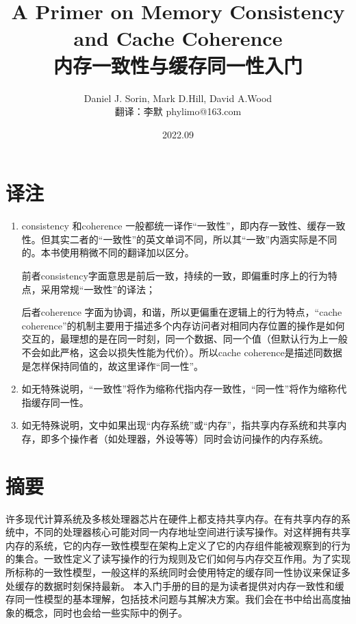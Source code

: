 \documentclass[UTF-8]{ctexrep}
\begin{document}
\title{\textbf{A Primer on Memory Consistency and Cache Coherence}\\内存一致性与缓存同一性入门}
\author{Daniel J. Sorin, Mark D.Hill, David A.Wood \\翻译：李默 phylimo@163.com}
\date{2022.09}
\maketitle
{}
\chapter*{\textbf{译注}}

\begin{enumerate}
\item consistency 和coherence 一般都统一译作“一致性”，即内存一致性、缓存一致性。但其实二者的“一致性”的英文单词不同，所以其“一致”内涵实际是不同的。本书使用稍微不同的翻译加以区分。
\par 前者consistency字面意思是前后一致，持续的一致，即偏重时序上的行为特点，采用常规“一致性”的译法；
\par 后者coherence 字面为协调，和谐，所以更偏重在逻辑上的行为特点，“cache coherence”的机制主要用于描述多个内存访问者对相同内存位置的操作是如何交互的，最理想的是在同一时刻，同一个数据、同一个值（但默认行为上一般不会如此严格，这会以损失性能为代价）。所以cache coherence是描述同数据是怎样保持同值的，故这里译作“同一性”。
\item 如无特殊说明，“一致性”将作为缩称代指内存一致性，“同一性”将作为缩称代指缓存同一性。
\item 如无特殊说明，文中如果出现“内存系统”或“内存”，指共享内存系统和共享内存，即多个操作者（如处理器，外设等等）同时会访问操作的内存系统。
\end{enumerate}

\tableofcontents
\chapter*{摘要}
许多现代计算系统及多核处理器芯片在硬件上都支持共享内存。在有共享内存的系统中，不同的处理器核心可能对同一内存地址空间进行读写操作。对这样拥有共享内存的系统，它的内存一致性模型在架构上定义了它的内存组件能被观察到的行为的集合。一致性定义了读写操作的行为规则及它们如何与内存交互作用。为了实现所标称的一致性模型，一般这样的系统同时会使用特定的缓存同一性协议来保证多处缓存的数据时刻保持最新。 本入门手册的目的是为读者提供对内存一致性和缓存同一性模型的基本理解，包括技术问题与其解决方案。我们会在书中给出高度抽象的概念，同时也会给一些实际中的例子。
\end{document}
